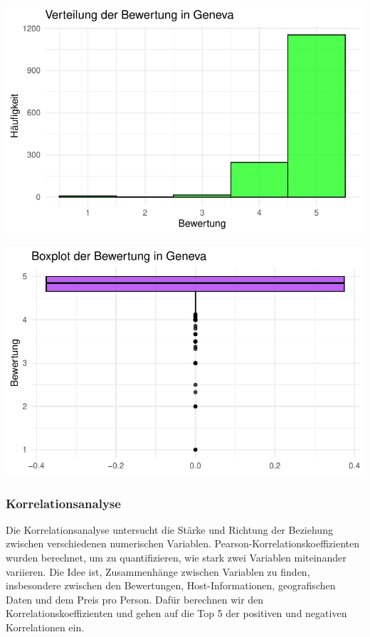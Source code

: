 \documentclass[
  journal,
]{IEEEtran}%
\begin{document}
\includegraphics{main_files/figure-pdf/descriptive geneva-3.pdf}

\includegraphics{main_files/figure-pdf/descriptive geneva-4.pdf}

\hypertarget{korrelationsanalyse}{%
\subsubsection{\texorpdfstring{\textbf{Korrelationsanalyse}}{Korrelationsanalyse}}\label{korrelationsanalyse}}

Die Korrelationsanalyse untersucht die Stärke und Richtung der Beziehung
zwischen verschiedenen numerischen Variablen.
Pearson-Korrelationskoeffizienten wurden berechnet, um zu
quantifizieren, wie stark zwei Variablen miteinander variieren. Die Idee
ist, Zusammenhänge zwischen Variablen zu finden, insbesondere zwischen
den Bewertungen, Host-Informationen, geografischen Daten und dem Preis
pro Person. Dafür berechnen wir den Korrelationskoeffizienten und gehen
auf die Top 5 der positiven und negativen Korrelationen ein.
\end{document}
